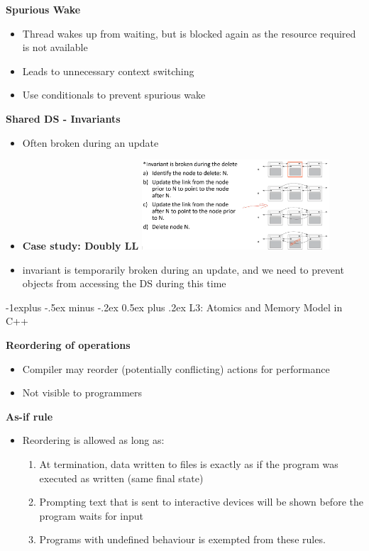 \documentclass[10pt, landscape]{article}
\makeatletter
\renewcommand{\subsection}{\@startsection{subsection}{2}{0mm}%
                                {-1explus -.5ex minus -.2ex}%
                                {0.5ex plus .2ex}%
                                {\normalfont\normalsize\bfseries}}
\makeatother
\begin{document}
\begin{multicols}{4}
\begin{itemize}
\textbf{Spurious Wake} \\ 
\begin{itemize}
    \item Thread wakes up from waiting, but is blocked again as the resource required is not available
    \item Leads to unnecessary context switching
    \item Use conditionals to prevent spurious wake
\end{itemize}

\end{itemize}

\textbf{Shared DS - Invariants} \\ 
\begin{itemize}
    \item Often broken during an update 
    \item \textbf{Case study: Doubly LL}
\includegraphics*[width=7cm]{dll.png}
    \item  invariant is temporarily broken during an update, and we need to prevent objects from accessing the DS during this time
\end{itemize}

\subsection{L3: Atomics and Memory Model in C++} 

\textbf{Reordering of operations} \\ 
\begin{itemize}
    \item Compiler may reorder (potentially conflicting) actions for performance 
    \item Not visible to programmers
\end{itemize}

\textbf{As-if rule} \\
\begin{itemize}
    \item Reordering is allowed as long as:
    \begin{enumerate}
        \item At termination, data written to files is exactly as if the program was executed as written (same final state)
        \item Prompting text that is sent to interactive devices will be shown before the program waits for input
        \item Programs with undefined behaviour is exempted from these rules.
    \end{enumerate}
\end{itemize}


\end{multicols}
\end{document}
